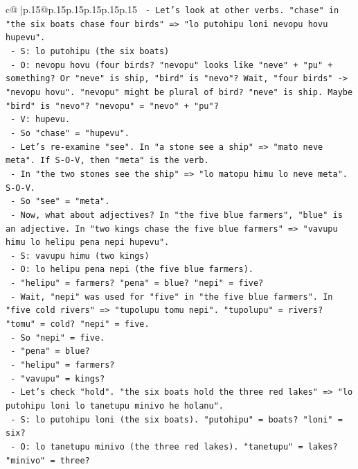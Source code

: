 \documentclass{article}
\begin{document}
{\begin{supertabular}{c@{$\;$}|p{.15\linewidth}@{}p{.15\linewidth}p{.15\linewidth}p{.15\linewidth}p{.15\linewidth}p{.15\linewidth}}
{{{\texttt{   {-} Let's look at other verbs. "chase" in "the six boats chase four birds" => "lo putohipu loni nevopu hovu hupevu".} \\
\texttt{     {-} S: lo putohipu (the six boats)} \\
\texttt{     {-} O: nevopu hovu (four birds? "nevopu" looks like "neve" + "pu" + something? Or "neve" is ship, "bird" is "nevo"? Wait, "four birds" {-}> "nevopu hovu". "nevopu" might be plural of bird? "neve" is ship. Maybe "bird" is "nevo"? "nevopu" = "nevo" + "pu"?} \\
\texttt{     {-} V: hupevu.} \\
\texttt{     {-} So "chase" = "hupevu".} \\
\texttt{   {-} Let's re{-}examine "see". In "a stone see a ship" => "mato neve meta". If S{-}O{-}V, then "meta" is the verb.} \\
\texttt{   {-} In "the two stones see the ship" => "lo matopu himu lo neve meta". S{-}O{-}V.} \\
\texttt{   {-} So "see" = "meta".} \\
\texttt{   {-} Now, what about adjectives? In "the five blue farmers", "blue" is an adjective. In "two kings chase the five blue farmers" => "vavupu himu lo helipu pena nepi hupevu".} \\
\texttt{     {-} S: vavupu himu (two kings)} \\
\texttt{     {-} O: lo helipu pena nepi (the five blue farmers).} \\
\texttt{     {-} "helipu" = farmers? "pena" = blue? "nepi" = five?} \\
\texttt{     {-} Wait, "nepi" was used for "five" in "the five blue farmers". In "five cold rivers" => "tupolupu tomu nepi". "tupolupu" = rivers? "tomu" = cold? "nepi" = five.} \\
\texttt{     {-} So "nepi" = five.} \\
\texttt{     {-} "pena" = blue?} \\
\texttt{     {-} "helipu" = farmers?} \\
\texttt{     {-} "vavupu" = kings?} \\
\texttt{   {-} Let's check "hold". "the six boats hold the three red lakes" => "lo putohipu loni lo tanetupu minivo he holanu".} \\
\texttt{     {-} S: lo putohipu loni (the six boats). "putohipu" = boats? "loni" = six?} \\
\texttt{     {-} O: lo tanetupu minivo (the three red lakes). "tanetupu" = lakes? "minivo" = three?} \\
}}}
\end{supertabular}}
\end{document}
